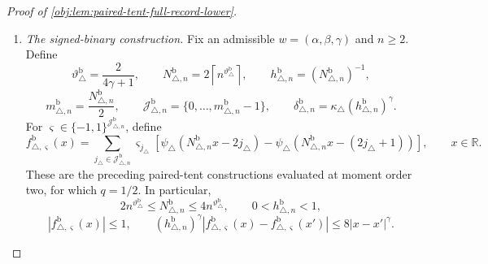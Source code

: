 \begin{proof}[Proof of \cref{obj:lem:paired-tent-full-record-lower}]
\begin{enumerate}
For an original-record test \(\phi\), use instead
\[
\overline\phi(\mathcal D_n)
=\int_0^1\phi(\mathcal D_n,\varpi_{\mathrm{seed}})\,\lambda(d\varpi_{\mathrm{seed}}).
\]
The identical expectation comparison gives
\[
2^{-m_{\triangle,n}}\sum_\varsigma
\mathsf R_n(P_\varsigma,\phi)<\frac35.
\]
The same weighted-sum contradiction supplies a support law with type-II
error at least \(2/5\). Taking the supremum and then the infimum in
\cref{obj:def:testing-risk} proves
\[
B_n(v,r_\triangle)\ge\frac25.
\]
This completes the first witness package.

\item \emph{The signed-binary construction.}
Fix an admissible \(w=(\alpha,\beta,\gamma)\) and \(n\ge2\). Define
\[
\vartheta_\triangle^{\mathrm b}=\frac2{4\gamma+1},
\qquad
N_{\triangle,n}^{\mathrm b}
=2\left\lceil n^{\vartheta_\triangle^{\mathrm b}}\right\rceil,
\qquad
h_{\triangle,n}^{\mathrm b}=(N_{\triangle,n}^{\mathrm b})^{-1},
\]
\[
m_{\triangle,n}^{\mathrm b}=\frac{N_{\triangle,n}^{\mathrm b}}2,
\qquad
\mathscr J_{\triangle,n}^{\mathrm b}
=\{0,\ldots,m_{\triangle,n}^{\mathrm b}-1\},
\qquad
\delta_{\triangle,n}^{\mathrm b}
=\kappa_\triangle(h_{\triangle,n}^{\mathrm b})^\gamma.
\]
For \(\varsigma\in\{-1,1\}^{\mathscr J_{\triangle,n}^{\mathrm b}}\), define
\[
f_{\triangle,\varsigma}^{\mathrm b}(x)
=
\sum_{j_\triangle\in\mathscr J_{\triangle,n}^{\mathrm b}}
\varsigma_{j_\triangle}
\left[
\psi_\triangle(N_{\triangle,n}^{\mathrm b}x-2j_\triangle)
-\psi_\triangle(N_{\triangle,n}^{\mathrm b}x-(2j_\triangle+1))
\right],
\qquad x\in\mathbb R.
\]
These are the preceding paired-tent constructions evaluated at moment order
two, for which \(q=1/2\). In particular,
\[
2n^{\vartheta_\triangle^{\mathrm b}}
\le N_{\triangle,n}^{\mathrm b}
\le4n^{\vartheta_\triangle^{\mathrm b}},
\qquad
0<h_{\triangle,n}^{\mathrm b}<1,
\]
\[
|f_{\triangle,\varsigma}^{\mathrm b}(x)|\le1,
\qquad
(h_{\triangle,n}^{\mathrm b})^\gamma
|f_{\triangle,\varsigma}^{\mathrm b}(x)
-f_{\triangle,\varsigma}^{\mathrm b}(x')|
\le8|x-x'|^\gamma.
\]


\end{enumerate}
\end{proof}
